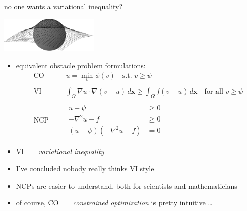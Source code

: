 \documentclass[10pt,hyperref,dvipsnames]{beamer}
\newcommand{\bx}{\mathbf{x}}
\newcommand{\grad}{\nabla}
\begin{document}
\begin{frame}{no one wants a variational inequality?}

\hfill \includegraphics[width=0.35\textwidth]{figs/obstacle65.pdf}

\vspace{-15mm}
\begin{itemize}
\item equivalent obstacle problem formulations:
\begin{align*}
    \text{CO}& &&u = \min_{v} \phi(v) \quad \text{s.t. } v \ge \psi \\
    & \\
    \text{VI}& &&\int_\Omega \grad u \cdot \grad(v-u)\,d\bx \ge \int_\Omega f(v-u)\,d\bx \quad \text{for all } v \ge \psi \\
    & \\
   \text{NCP}& &&\begin{aligned} u - \psi &\ge 0 \\
                                 -\grad^2 u - f &\ge 0 \\
                                 (u - \psi) ( -\grad^2 u - f) &= 0 \end{aligned}
\end{align*}
\item VI $=$ \emph{variational inequality}
\item I've concluded nobody really thinks VI style
\item NCPs are easier to understand, both for scientists and mathematicians
\item of course, CO $=$ \emph{constrained optimization} is pretty intuitive \dots
\end{itemize}
\end{frame}
\end{document}
